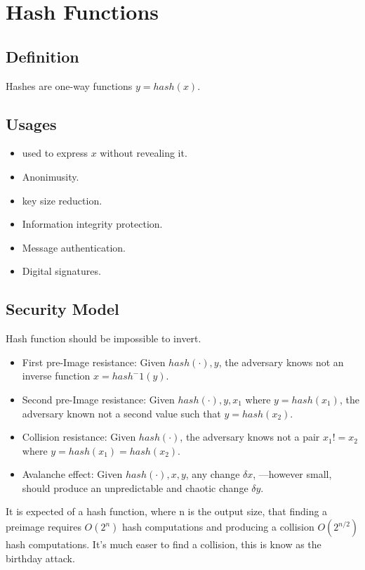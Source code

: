 \chapter{Hash Functions}
\section{Definition}
Hashes are one-way functions $y = hash(x)$. 

\section{Usages}
\begin{itemize}
    \item used to express $x$ without revealing it. 
    \item Anonimusity.
    \item key size reduction.
    \item Information integrity protection.
    \item Message authentication.
    \item Digital signatures.
\end{itemize}



\section{Security Model}
Hash function should be impossible to invert. 
\begin{itemize}
    \item First pre-Image resistance: Given $hash(\cdot), y$, the adversary knows not an inverse function $x = hash^-1(y)$. 
    \item Second pre-Image resistance: Given $hash(\cdot), y, x_{1}$ where $y = hash(x_{1})$, the adversary known not a second value such that $y = hash(x_{2})$. 
    \item Collision resistance: Given $hash(\cdot)$, the adversary knows not a pair $x_{1} != x_{2}$ where $y = hash(x_{1}) = hash(x_2)$.
    \item Avalanche effect: Given $hash(\cdot), x, y$, any change $\delta{}x$, ---however small, should produce an unpredictable and chaotic change $\delta{}y$.
\end{itemize}

It is expected of a hash function, where n is the output size, that finding a preimage requires $O(2^n)$ hash computations and producing a collision $O(2^{n/2})$ 
hash computations. It's much easer to find a collision, this is know as the birthday attack. 

